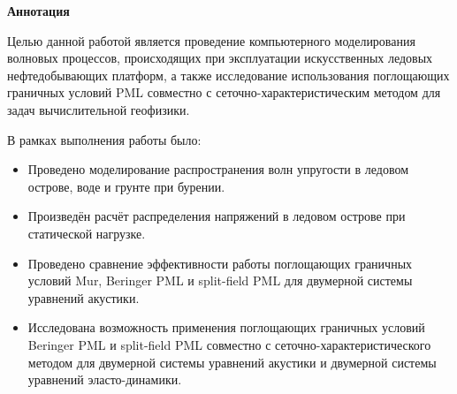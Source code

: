 \thispagestyle{plain}
\begin{center}
    \Large
    \textbf{Аннотация}
\end{center}

Целью данной работой является проведение  компьютерного моделирования волновых процессов, происходящих при эксплуатации искусственных ледовых нефтедобывающих платформ, а также исследование использования поглощающих граничных условий PML совместно с сеточно-характеристическим методом для задач вычислительной геофизики.

В рамках выполнения работы было:
\begin{itemize}
    \item Проведено моделирование распространения волн упругости в ледовом острове, воде и грунте при бурении.
    \item Произведён расчёт распределения напряжений в ледовом острове при статической нагрузке.
    \item Проведено сравнение эффективности работы поглощающих граничных условий Mur, Beringer PML и split-field PML для двумерной системы уравнений акустики.
    \item Исследована возможность применения поглощающих граничных условий Beringer PML и split-field PML совместно с сеточно-характеристического методом для двумерной системы уравнений акустики и двумерной системы уравнений эласто-динамики.
\end{itemize}

\newpage